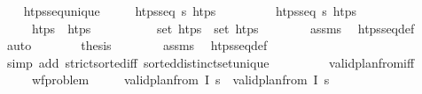 \begin{isabellebody}
\ \ \isamarkupfalse%
\ htps{\isacharunderscore}{\kern0pt}seq{\isacharunderscore}{\kern0pt}unique{\isacharcolon}{\kern0pt}\isanewline
\ \ \ \ \ {\isachardoublequoteopen}htps{\isacharunderscore}{\kern0pt}seq\ {\isasympi}s\ htps\isanewline
\ \ \ \ \ \ \ \ \ {\isachardoublequoteopen}htps{\isacharunderscore}{\kern0pt}seq\ {\isasympi}s\ htps\isanewline
\ \ \ \ \ {\isachardoublequoteopen}htps\ {\isacharequal}{\kern0pt}\ htps\isanewline
%
\isadelimproof
\ \ %
\endisadelimproof
%
\isatagproof
{}\isamarkupfalse%
\ {\isacharminus}{\kern0pt}\isanewline
\ \ \ \ \isamarkupfalse%
\ {\isachardoublequoteopen}set\ htps\ {\isacharequal}{\kern0pt}\ set\ htps\isanewline
\ \ \ \ \ \ \isamarkupfalse%
\ assms\ \isamarkupfalse%
\ htps{\isacharunderscore}{\kern0pt}seq{\isacharunderscore}{\kern0pt}def\ \isamarkupfalse%
\ auto\isanewline
\ \ \ \ \isamarkupfalse%
\ \isamarkupfalse%
\ {\isacharquery}{\kern0pt}thesis\isanewline
\ \ \ \ \ \ \isamarkupfalse%
\ assms\ \isamarkupfalse%
\ htps{\isacharunderscore}{\kern0pt}seq{\isacharunderscore}{\kern0pt}def\ \isamarkupfalse%
\ {\isacharparenleft}{\kern0pt}simp\ add{\isacharcolon}{\kern0pt}\ strict{\isacharunderscore}{\kern0pt}sorted{\isacharunderscore}{\kern0pt}iff\ sorted{\isacharunderscore}{\kern0pt}distinct{\isacharunderscore}{\kern0pt}set{\isacharunderscore}{\kern0pt}unique{\isacharparenright}{\kern0pt}\isanewline
\ \ \isamarkupfalse%
%
\endisatagproof
{\isafoldproof}%
%
\isadelimproof
\isanewline
%
\endisadelimproof
\ \ \isanewline
\isanewline
\ \ \isamarkupfalse%
\ valid{\isacharunderscore}{\kern0pt}plan{\isacharunderscore}{\kern0pt}from{}{\isacharunderscore}{\kern0pt}iff{\isacharcolon}{\kern0pt}\isanewline
\ \ \ \ \ {\isachardoublequoteopen}wf{\isacharunderscore}{\kern0pt}problem{\isachardoublequoteclose}\isanewline
\ \ \ \ \ {\isachardoublequoteopen}valid{\isacharunderscore}{\kern0pt}plan{\isacharunderscore}{\kern0pt}from{}\ I\ {\isasympi}s\ {\isasymlongleftrightarrow}\ valid{\isacharunderscore}{\kern0pt}plan{\isacharunderscore}{\kern0pt}from\ I\ {\isasympi}s{\isachardoublequoteclose}\isanewline

\end{isabellebody}
